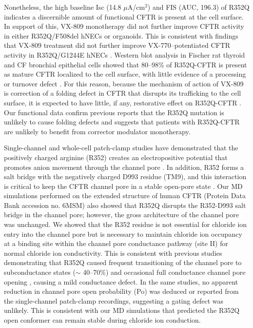 Nonetheless, the high baseline Isc (14.8 $\mu$A/cm$^2$) and FIS (AUC, 196.3) of R352Q indicates a discernible amount of functional CFTR is present at the cell surface. In support of this, VX-809 monotherapy did not further improve CFTR activity in either R352Q/F508del hNECs or organoids. This is consistent with findings that VX-809 treatment did not further improve VX-770–potentiated CFTR activity in R352Q/G1244E hNECs \cite{pranke2017}. Western blot analysis in Fischer rat thyroid and CF bronchial epithelial cells showed that 80–98\% of R352Q-CFTR is present as mature CFTR localized to the cell surface, with little evidence of a processing or turnover defect \cite{vangoor2014, veit2020}. For this reason, because the mechanism of action of VX-809 is correction of a folding defect in CFTR that disrupts its trafficking to the cell surface, it is expected to have little, if any, restorative effect on R352Q-CFTR \cite{vangoor2011}. Our functional data confirm previous reports that the R352Q mutation is unlikely to cause folding defects and suggests that patients with R352Q-CFTR are unlikely to benefit from corrector modulator monotherapy.

Single-channel and whole-cell patch-clamp studies have demonstrated that the positively charged arginine (R352) creates an electropositive potential that promotes anion movement through the channel pore \cite{guinamard1999}. In addition, R352 forms a salt bridge with the negatively charged D993 residue (TM9), and this interaction is critical to keep the CFTR channel pore in a stable open-pore state \cite{cui2013a}. Our MD simulations performed on the extended structure of human CFTR (Protein Data Bank accession no. 6MSM) also showed that R352Q disrupts the R352-D993 salt bridge in the channel pore; however, the gross architecture of the channel pore was unchanged. We showed that the R352 residue is not essential for chloride ion entry into the channel pore but is necessary to maintain chloride ion occupancy at a binding site within the channel pore conductance pathway (site II) for normal chloride ion conductivity. This is consistent with previous studies demonstrating that R352Q caused frequent transitioning of the channel pore to subconductance states ($\sim$ 40–70\%) and occasional full conductance channel pore opening \cite{zhang2017b, cui2008}, causing a mild conductance defect. In the same studies, no apparent reduction in channel pore open probability (Po) was deduced or reported from the single-channel patch-clamp recordings, suggesting a gating defect was unlikely. This is consistent with our MD simulations that predicted the R352Q open conformer can remain stable during chloride ion conduction.

